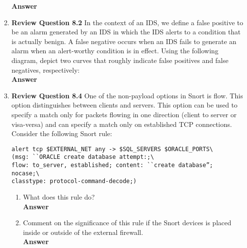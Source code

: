 \documentclass[12pt]{article}
\begin{document}
\begin{enumerate}
\textbf{Answer} \\

\item \textbf{Review Question 8.2} In the context of an IDS, we define a false positive to be an alarm generated by an IDS in which the IDS alerts to a condition that is actually benign. A false negative occurs when an IDS fails to generate an alarm when an alert-worthy condition is in effect. Using the following diagram, depict two curves that roughly indicate false positives and false negatives, respectively:\\

\textbf{Answer} \\

\item \textbf{Review Question 8.4} One of the non-payload options in Snort is flow. This option distinguishes between clients and servers. This option can be used to specify a match only for packets flowing in one direction (client to server or visa-versa) and can specify a match only on established TCP connections. Consider the following Snort rule: \\

{\color{blue}
\begin{verbatim}
alert tcp $EXTERNAL_NET any -> $SQL_SERVERS $ORACLE_PORTS\
(msg: ``ORACLE create database attempt:;\
flow: to_server, established; content: ``create database”;
nocase;\
classtype: protocol-command-decode;)
\end{verbatim}
}

\begin{enumerate}
\item {What does this rule do?} \\

\textbf{Answer} \\

\item {Comment on the significance of this rule if the Snort devices is placed inside or outside of the external firewall.} \\

\textbf{Answer} \\

\end{enumerate}


\end{enumerate}
\end{document}
